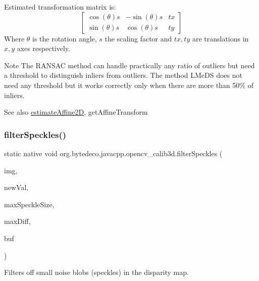 Estimated transformation matrix is\+: \[ \begin{bmatrix} \cos(\theta)s & -\sin(\theta)s & tx \\ \sin(\theta)s & \cos(\theta)s & ty \end{bmatrix} \] Where $ \theta $ is the rotation angle, $ s $ the scaling factor and $ tx, ty $ are translations in $ x, y $ axes respectively. 

\begin{DoxyNote}{Note}
The R\+A\+N\+S\+AC method can handle practically any ratio of outliers but need a threshold to distinguish inliers from outliers. The method L\+Me\+DS does not need any threshold but it works correctly only when there are more than 50\% of inliers. 
\end{DoxyNote}
\begin{DoxySeeAlso}{See also}
\hyperlink{group__calib3d_ga3ac5c98614a2c26448c68e407388473f}{estimate\+Affine2D}, get\+Affine\+Transform 
\end{DoxySeeAlso}
\mbox{\label{group__calib3d_ga18894b69acb224417c0f0a1afaded536}} 
\subsubsection{\texorpdfstring{filter\+Speckles()}{filterSpeckles()}}
{\footnotesize\ttfamily static native void org.\+bytedeco.\+javacpp.\+opencv\+\_\+calib3d.\+filter\+Speckles (\begin{DoxyParamCaption}\item[{@By\+Val Mat}]{img,  }\item[{double}]{new\+Val,  }\item[{int}]{max\+Speckle\+Size,  }\item[{double}]{max\+Diff,  }\item[{@By\+Val(null\+Value=\char`\"{}cv\+::\+Input\+Output\+Array(cv\+::no\+Array())\char`\"{}) Mat}]{buf }\end{DoxyParamCaption})\hspace{0.3cm}{\ttfamily [static]}}



Filters off small noise blobs (speckles) in the disparity map. 


